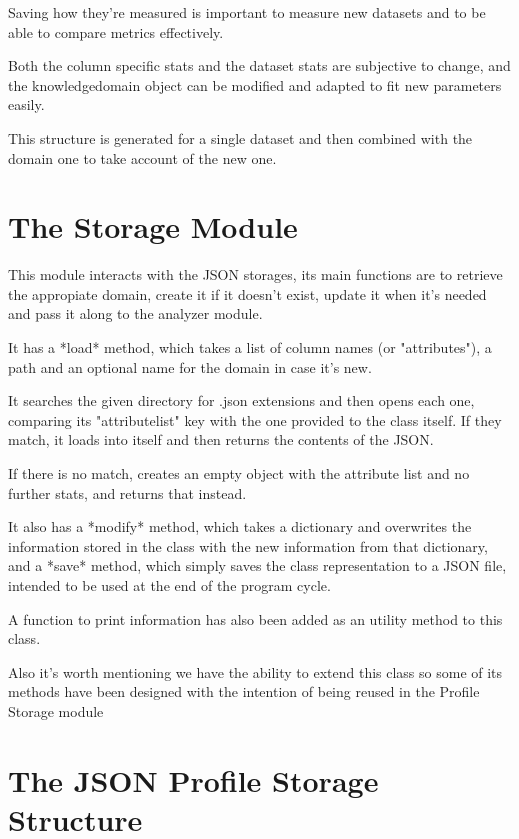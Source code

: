 Saving how they're measured is important to measure new datasets and to be able to compare metrics effectively.

Both the column specific stats and the dataset stats are subjective to change, and the knowledgedomain object can be modified and adapted to fit new parameters easily.

This structure is generated for a single dataset and then combined with the domain one to take account of the new one.

\section{The Storage Module}
\label{cap2:sec:storage}

This module interacts with the JSON storages, its main functions are to retrieve the appropiate domain, create it if it doesn't exist, update it when it's needed and pass it along to the analyzer module.

It has a *load* method, which takes a list of column names (or "attributes"), a path and an optional name for the domain in case it's new. 

It searches the given directory for .json extensions and then opens each one, comparing its "attributelist" key with the one provided to the class itself. If they match, it loads into itself and then returns the contents of the JSON.

If there is no match, creates an empty object with the attribute list and no further stats, and returns that instead.

It also has a *modify* method, which takes a dictionary and overwrites the information stored in the class with the new information from that dictionary, and a *save* method, which simply saves the class representation to a JSON file, intended to be used at the end of the program cycle.

A function to print information has also been added as an utility method to this class.

Also it's worth mentioning we have the ability to extend this class so some of its methods have been designed with the intention of being reused in the Profile Storage module

\section{The JSON Profile Storage Structure}
\label{cap2:sec:profilejson}

